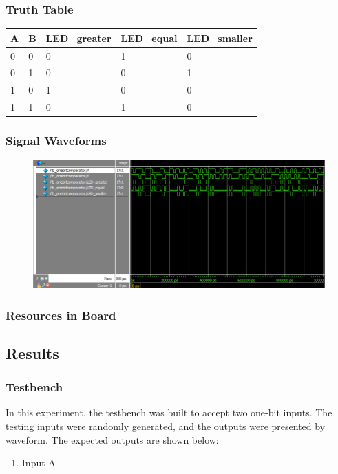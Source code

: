    \subsubsection{Truth Table}
    \begin{table}[h]
    \centering
        \begin{tabular}{|l|l|l|l|l|}
        \hline
        A & B & LED\_greater & LED\_equal & LED\_smaller \\ \hline
        0 & 0 & 0            & 1          & 0            \\ \hline
        0 & 1 & 0            & 0          & 1            \\ \hline
        1 & 0 & 1            & 0          & 0            \\ \hline
        1 & 1 & 0            & 1          & 0            \\ \hline
        \end{tabular}
    \end{table}
    \FloatBarrier
    \subsubsection{Signal Waveforms}
    \begin{figure}[h]
        \centering
        \includegraphics[width=0.8\linewidth]{Testbench_Waveform/tb_onebitcomparator_waveform.png}
        \label{tb_obc}
    \end{figure}
    \FloatBarrier
    \subsubsection{Resources in Board}

\subsection{Results}%
    \subsubsection{Testbench}
    In this experiment, the testbench was built to accept two one-bit inputs. The testing inputs were randomly generated, and the outputs were presented by waveform. The expected outputs are shown below:
    \begin{enumerate}
        \item Input A
    \end{enumerate}

